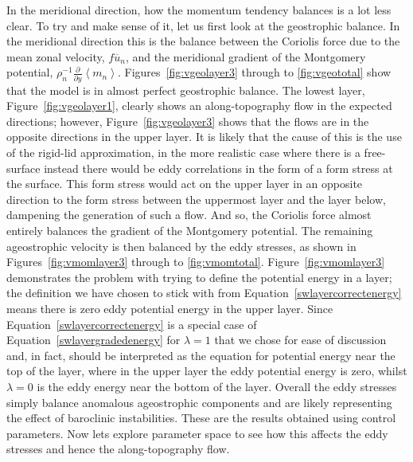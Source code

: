 \documentclass[12pt,a4paper]{report}
\newcommand*\thkmean[1]{\overline{#1}}
\newcommand*\nthkmean[1]{\left\langle{#1}\right\rangle}
\newcommand*\figref[1]{Figure~\ref{#1}}
\newcommand*\equref[1]{Equation~\eqref{#1}}
\newcommand*{\partialdiff}[2][{}]{\frac{\partial #1}{\partial #2}}
\begin{document}
 In the meridional direction, how the momentum tendency balances is a lot
 less clear. To try and make sense of it, let us first look at
 the geostrophic balance. In the meridional direction this
 is the balance between the Coriolis force due to the mean zonal velocity,
 $f\thkmean{u}_{n}$,
 and the meridional gradient of the Montgomery potential,
 $\rho_{n}^{-1}\partialdiff{y}\nthkmean{m_{n}}$. Figures~\ref{fig:vgeolayer3}
 through to \ref{fig:vgeototal} show that the model is in almost perfect
 geostrophic balance. The lowest layer, \figref{fig:vgeolayer1}, clearly shows
 an along-topography flow in the expected directions; however, \figref{fig:vgeolayer3}
 shows that the flows are in the opposite directions in the upper layer. 
 It is likely that the cause of this is the use of the rigid-lid approximation,
 in the more realistic case where there is a free-surface instead there would be
 eddy correlations in the form of a form stress at the surface. This form stress 
 would act on the upper layer in an opposite direction to the form stress 
 between the uppermost layer and the layer below, dampening the generation of 
 such a flow. And so, the Coriolis force almost entirely balances the 
 gradient of the Montgomery potential. The remaining ageostrophic velocity
 is then balanced by the eddy stresses, as shown in Figures~\ref{fig:vmomlayer3}
 through to \ref{fig:vmomtotal}. \figref{fig:vmomlayer3} demonstrates
 the problem with trying to define the potential energy in a layer;
 the definition we have chosen to stick with from \equref{swlayercorrectenergy}
 means there is zero eddy potential energy in the upper layer.
 Since \equref{swlayercorrectenergy} is a special case of \equref{swlayergradedenergy} 
 for $\lambda = 1$ that we chose for ease of discussion and, in fact,
 should be interpreted as the equation for potential energy near the top of the layer,
 where in the upper layer the eddy potential energy is zero, whilst 
 $\lambda = 0$ is the eddy energy near the bottom of the layer.
 Overall the eddy
 stresses simply balance anomalous ageostrophic components and are
 likely representing the effect of baroclinic instabilities.
 These are the results obtained using control parameters. Now lets explore parameter space
 to see how this affects the eddy stresses and hence the along-topography flow.
  	
\end{document}
